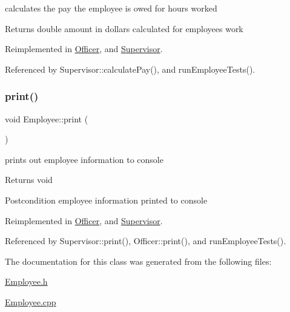 calculates the pay the employee is owed for hours worked

\begin{DoxyReturn}{Returns}
double amount in dollars calculated for employee\textquotesingle{}s work 
\end{DoxyReturn}


Reimplemented in \hyperlink{classOfficer_a1fa1aad39b9e95be7a088990ebf17059}{Officer}, and \hyperlink{classSupervisor_aa37daa89523c08b84ae8141299e036f8}{Supervisor}.



Referenced by Supervisor\+::calculate\+Pay(), and run\+Employee\+Tests().

\mbox{\label{classEmployee_a79556ad700627dba88049f487a34a762}} 
\subsubsection{\texorpdfstring{print()}{print()}}
{\footnotesize\ttfamily void Employee\+::print (\begin{DoxyParamCaption}{ }\end{DoxyParamCaption})\hspace{0.3cm}{\ttfamily [virtual]}}

prints out employee information to console

\begin{DoxyReturn}{Returns}
void 
\end{DoxyReturn}
\begin{DoxyPostcond}{Postcondition}
employee information printed to console 
\end{DoxyPostcond}


Reimplemented in \hyperlink{classOfficer_aeadece05a1a0b7fb29bd412830d2e07a}{Officer}, and \hyperlink{classSupervisor_a92483dc9a54904d79b46c6ec4efb3f54}{Supervisor}.



Referenced by Supervisor\+::print(), Officer\+::print(), and run\+Employee\+Tests().



The documentation for this class was generated from the following files\+:\begin{DoxyCompactItemize}
\item 
\hyperlink{Employee_8h}{Employee.\+h}\item 
\hyperlink{Employee_8cpp}{Employee.\+cpp}\end{DoxyCompactItemize}
